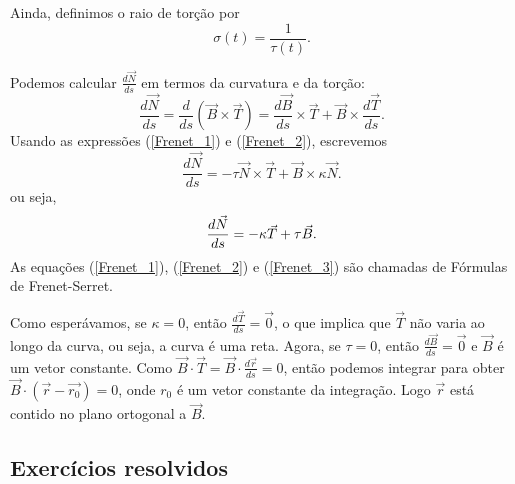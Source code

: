 Ainda, definimos o raio de torção por
$$
\sigma(t)=\frac{1}{\tau(t)}.
$$

Podemos calcular $\frac{d\vec{N}}{ds}$ em termos da curvatura e da torção:
\begin{equation*}
\frac{d\vec{N}}{ds}=\frac{d}{ds}\left(\vec{B}\times\vec{T}\right)=\frac{d\vec{B}}{ds}\times \vec{T}+\vec{B}\times\frac{d\vec{T}}{ds}.
\end{equation*}
Usando as expressões (\ref{Frenet_1}) e (\ref{Frenet_2}), escrevemos
\begin{equation*}
\frac{d\vec{N}}{ds}=-\tau\vec{N} \times \vec{T}+\vec{B}\times \kappa \vec{N}.
\end{equation*}
ou seja,
\begin{equation}{\label{Frenet_3}}
\frac{d\vec{N}}{ds}=-\kappa \vec{T}+\tau \vec{B}.
\end{equation}
As equações (\ref{Frenet_1}), (\ref{Frenet_2}) e (\ref{Frenet_3}) são chamadas de Fórmulas de Frenet-Serret.

Como esperávamos, se $\kappa=0$, então $\frac{d\vec{T}}{ds}=\vec{0}$, o que implica que $\vec{T}$ não varia ao longo da curva, ou seja, a curva é uma reta. Agora, se $\tau=0$, então $\frac{d\vec{B}}{ds}=\vec{0}$ e $\vec{B}$ é um vetor constante. Como $\vec{B}\cdot \vec{T}=\vec{B}\cdot \frac{d\vec{r}}{ds}=0$, então podemos integrar para obter $\vec{B}\cdot (\vec{r}-\vec{r_0})=0$, onde $r_0$ é um vetor constante da integração. Logo $\vec{r}$ está contido no plano ortogonal a $\vec{B}$.

\subsection*{Exercícios resolvidos}


